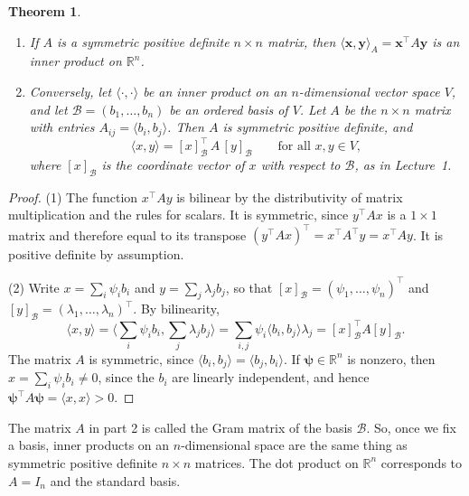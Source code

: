 \documentclass[11pt]{article}
\newcommand{\ip}[2]{\langle #1, #2 \rangle}
\theoremstyle{definition}
\theoremstyle{plain}
\newtheorem{theorem}[definition]{Theorem}
\theoremstyle{remark}
\begin{document}
\begin{theorem}\label{thm:spd}
    \begin{enumerate}
        \item If $A$ is a symmetric positive definite $n \times n$ matrix, then $\ip{\mathbf{x}}{\mathbf{y}}_A = \mathbf{x}^\top A \mathbf{y}$ is an inner product on $\mathbb{R}^n$.
        \item Conversely, let $\ip{\cdot}{\cdot}$ be an inner product on an $n$-dimensional vector space $V$, and let $\mathcal{B} = (b_1, \ldots, b_n)$ be an ordered basis of $V$. Let $A$ be the $n \times n$ matrix with entries $A_{ij} = \ip{b_i}{b_j}$. Then $A$ is symmetric positive definite, and
        \[\ip{x}{y} = [x]_{\mathcal{B}}^\top \, A \, [y]_{\mathcal{B}} \qquad \text{for all } x, y \in V,\]
        where $[x]_{\mathcal{B}}$ is the coordinate vector of $x$ with respect to $\mathcal{B}$, as in Lecture~1.
    \end{enumerate}
\end{theorem}

\begin{proof}
    (1) The function $x^\top A y$ is bilinear by the distributivity of matrix multiplication and the rules for scalars. It is symmetric, since $y^\top A x$ is a $1 \times 1$ matrix and therefore equal to its transpose $(y^\top A x)^\top = x^\top A^\top y = x^\top A y$. It is positive definite by assumption.

    (2) Write $x = \sum_i \psi_i b_i$ and $y = \sum_j \lambda_j b_j$, so that $[x]_{\mathcal{B}} = (\psi_1, \ldots, \psi_n)^\top$ and $[y]_{\mathcal{B}} = (\lambda_1, \ldots, \lambda_n)^\top$. By bilinearity,
    \[\ip{x}{y} = \Big\langle \sum_i \psi_i b_i, \sum_j \lambda_j b_j \Big\rangle = \sum_{i, j} \psi_i \ip{b_i}{b_j} \lambda_j = [x]_{\mathcal{B}}^\top A [y]_{\mathcal{B}}.\]
    The matrix $A$ is symmetric, since $\ip{b_i}{b_j} = \ip{b_j}{b_i}$. If $\boldsymbol{\psi} \in \mathbb{R}^n$ is nonzero, then $x = \sum_i \psi_i b_i \neq 0$, since the $b_i$ are linearly independent, and hence $\boldsymbol{\psi}^\top A \boldsymbol{\psi} =\ip{x}{x} > 0$.
\end{proof}

The matrix $A$ in part 2 is called the Gram matrix of the basis $\mathcal{B}$. So, once we fix a basis, inner products on an $n$-dimensional space are the same thing as symmetric positive definite $n \times n$ matrices. The dot product on $\mathbb{R}^n$ corresponds to $A = I_n$ and the standard basis.
\end{document}
